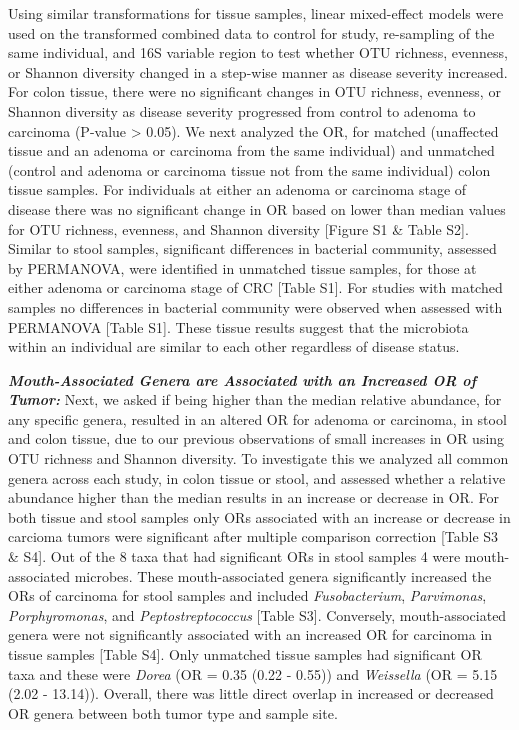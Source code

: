\documentclass[12pt,]{article}
\begin{document}
Using similar transformations for tissue samples, linear mixed-effect
models were used on the transformed combined data to control for study,
re-sampling of the same individual, and 16S variable region to test
whether OTU richness, evenness, or Shannon diversity changed in a
step-wise manner as disease severity increased. For colon tissue, there
were no significant changes in OTU richness, evenness, or Shannon
diversity as disease severity progressed from control to adenoma to
carcinoma (P-value \textgreater{} 0.05). We next analyzed the OR, for
matched (unaffected tissue and an adenoma or carcinoma from the same
individual) and unmatched (control and adenoma or carcinoma tissue not
from the same individual) colon tissue samples. For individuals at
either an adenoma or carcinoma stage of disease there was no significant
change in OR based on lower than median values for OTU richness,
evenness, and Shannon diversity {[}Figure S1 \& Table S2{]}. Similar to
stool samples, significant differences in bacterial community, assessed
by PERMANOVA, were identified in unmatched tissue samples, for those at
either adenoma or carcinoma stage of CRC {[}Table S1{]}. For studies
with matched samples no differences in bacterial community were observed
when assessed with PERMANOVA {[}Table S1{]}. These tissue results
suggest that the microbiota within an individual are similar to each
other regardless of disease status.

\textbf{\emph{Mouth-Associated Genera are Associated with an Increased
OR of Tumor:}} Next, we asked if being higher than the median relative
abundance, for any specific genera, resulted in an altered OR for
adenoma or carcinoma, in stool and colon tissue, due to our previous
observations of small increases in OR using OTU richness and Shannon
diversity. To investigate this we analyzed all common genera across each
study, in colon tissue or stool, and assessed whether a relative
abundance higher than the median results in an increase or decrease in
OR. For both tissue and stool samples only ORs associated with an
increase or decrease in carcioma tumors were significant after multiple
comparison correction {[}Table S3 \& S4{]}. Out of the 8 taxa that had
significant ORs in stool samples 4 were mouth-associated microbes. These
mouth-associated genera significantly increased the ORs of carcinoma for
stool samples and included \emph{Fusobacterium}, \emph{Parvimonas},
\emph{Porphyromonas}, and \emph{Peptostreptococcus} {[}Table S3{]}.
Conversely, mouth-associated genera were not significantly associated
with an increased OR for carcinoma in tissue samples {[}Table S4{]}.
Only unmatched tissue samples had significant OR taxa and these were
\emph{Dorea} (OR = 0.35 (0.22 - 0.55)) and \emph{Weissella} (OR = 5.15
(2.02 - 13.14)). Overall, there was little direct overlap in increased
or decreased OR genera between both tumor type and sample site.
\end{document}
